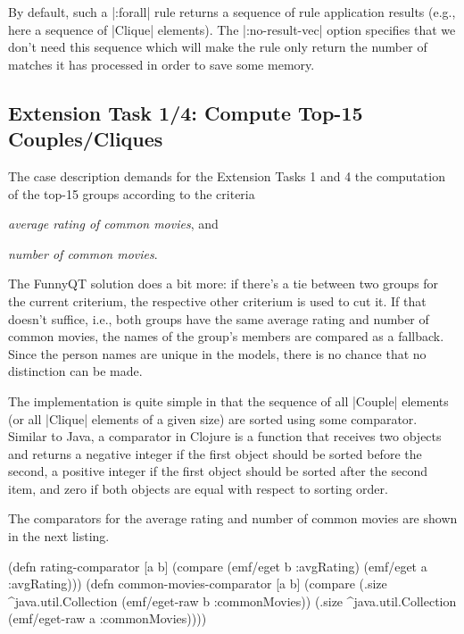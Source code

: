 \documentclass[submission]{eptcs}
\newcommand{\code}{\clojureinline}
\begin{document}
By default, such a \code|:forall| rule returns a sequence of rule application
results (e.g., here a sequence of \code|Clique| elements).  The
\code|:no-result-vec| option specifies that we don't need this sequence which
will make the rule only return the number of matches it has processed in order
to save some memory.


\subsection{Extension Task 1/4: Compute Top-15 Couples/Cliques}
\label{sec:ext-task-1:top-15}

The case description demands for the Extension Tasks 1 and 4 the computation of
the top-15 groups according to the criteria
\begin{inparaenum}[(a)]
\item \emph{average rating of common movies}, and
\item \emph{number of common movies}.
\end{inparaenum}
The FunnyQT solution does a bit more: if there's a tie between two groups for
the current criterium, the respective other criterium is used to cut it.  If
that doesn't suffice, i.e., both groups have the same average rating and number
of common movies, the names of the group's members are compared as a fallback.
Since the person names are unique in the models, there is no chance that no
distinction can be made.

The implementation is quite simple in that the sequence of all \code|Couple|
elements (or all \code|Clique| elements of a given size) are sorted using some
comparator.  Similar to Java, a comparator in Clojure is a function that
receives two objects and returns a negative integer if the first object should
be sorted before the second, a positive integer if the first object should be
sorted after the second item, and zero if both objects are equal with respect
to sorting order.

The comparators for the average rating and number of common movies are shown in
the next listing.

\begin{clojurecode}
(defn rating-comparator [a b]
  (compare (emf/eget b :avgRating) (emf/eget a :avgRating)))
(defn common-movies-comparator [a b]
  (compare (.size ^java.util.Collection (emf/eget-raw b :commonMovies))
           (.size ^java.util.Collection (emf/eget-raw a :commonMovies))))
\end{clojurecode}
\end{document}
